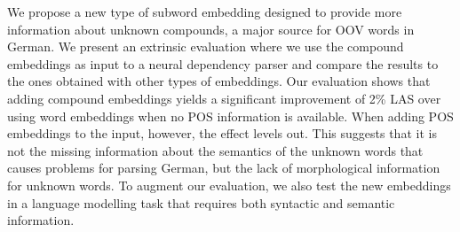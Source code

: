 We propose a new type of subword embedding designed to provide more information about unknown compounds, a major source for OOV words in German. We present an extrinsic evaluation where we use the compound embeddings as input to a neural dependency parser and compare the results to the ones obtained with other types of embeddings. Our evaluation shows that adding compound embeddings yields a significant improvement of 2\% LAS over using word embeddings when no POS information is available. When adding POS embeddings to the input, however, the effect levels out. This suggests that it is not the missing information about the semantics of the unknown words that causes problems for parsing German, but the lack of morphological information for unknown words. To augment our evaluation, we also test the new embeddings in a language modelling task that requires both syntactic and semantic information.

